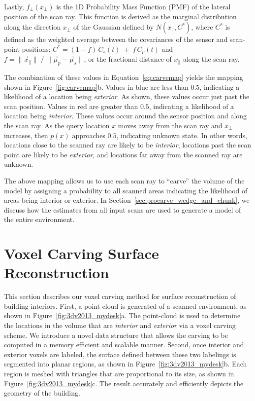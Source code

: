 \documentclass[12pt,onecolumn,oneside]{book}
\begin{document}
Lastly, $f_{\perp}(x_{\perp})$ is the 1D Probability Mass Function (PMF) of the lateral position of the scan ray.  This function is derived as the marginal distribution along the direction $x_{\perp}$ of the Gaussian defined by $N(x_{\parallel}, C^*)$, where $C^*$ is defined as the weighted average between the covariances of the sensor and scan-point positions:  $C^* = ( 1-f ) \,  C_s(t) \; + \; f \, C_p(t)$ and $f = \| \vec{x}_{\parallel} \| \; / \; \| \vec{\mu}_p - \vec{\mu}_s \|$, or the fractional distance of $x_{\parallel}$ along the scan ray.

The combination of these values in Equation~\ref{eq:carvemap} yields the mapping shown in Figure~\ref{fig:carvemap}b.  Values in blue are less than $0.5$, indicating a likelihood of a location being {\it exterior}.  As shown, these values occur just past the scan position.  Values in red are greater than $0.5$, indicating a likelihood of a location being {\it interior}.  These values occur around the sensor position and along the scan ray.  As the query location $x$ moves away from the scan ray and $x_{\perp}$ increases, then $p(x)$ approaches $0.5$, indicating unknown state.  In other words, locations close to the scanned ray are likely to be {\it interior}, locations past the scan point are likely to be {\it exterior}, and locations far away from the scanned ray are unknown.


The above mapping allows us to use each scan ray to ``carve'' the volume of the model by assigning a probability to all scanned areas indicating the likelihood of areas being interior or exterior.  In Section~\ref{sec:procarve_wedge_and_chunk}, we discuss how the estimates from all input scans are used to generate a model of the entire environment.  

\section{Voxel Carving Surface Reconstruction}
\label{sec:3dv2013}

This section describes our voxel carving method for surface reconstruction of building interiors.  First, a point-cloud is generated of a scanned environment, as shown in Figure~\ref{fig:3dv2013_mydesk}a.  The point-cloud is used to determine the locations in the volume that are {\it interior} and {\it exterior} via a voxel carving scheme.  We introduce a novel data structure that allows the carving to be computed in a memory efficient and scalable manner.  Second, once interior and exterior voxels are labeled, the surface defined between these two labelings is segmented into planar regions, as shown in Figure~\ref{fig:3dv2013_mydesk}b.  Each region is meshed with triangles that are proportional to its size, as shown in Figure~\ref{fig:3dv2013_mydesk}c.  The result accurately and efficiently depicts the geometry of the building.
\end{document}
